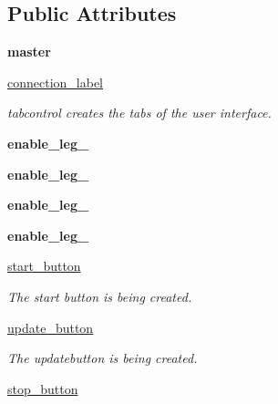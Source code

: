 \subsection*{Public Attributes}
\begin{DoxyCompactItemize}
\item 
\mbox{\label{classuser__interface_1_1GUI_ae7866f22227ae9688999aa757c0fea18}} 
{\bfseries master}
\item 
\hyperlink{classuser__interface_1_1GUI_a6f8c9e6abed97b6d338b8e4d9718dc7c}{connection\+\_\+label}
\begin{DoxyCompactList}\small\item\em tabcontrol creates the tabs of the user interface. \end{DoxyCompactList}\item 
\mbox{\label{classuser__interface_1_1GUI_aa4b397197906ad84e30580a810a655dd}} 
{\bfseries enable\+\_\+leg\+\_}
\item 
\mbox{\label{classuser__interface_1_1GUI_abbddb06508058d258c7d95441dece56d}} 
{\bfseries enable\+\_\+leg\+\_}
\item 
\mbox{\label{classuser__interface_1_1GUI_a4fd7bdcf24220df0222b5ec6d336c545}} 
{\bfseries enable\+\_\+leg\+\_}
\item 
\mbox{\label{classuser__interface_1_1GUI_afbc5abc61f35db93402945f6ed493da7}} 
{\bfseries enable\+\_\+leg\+\_}
\item 
\hyperlink{classuser__interface_1_1GUI_a961853020e92ea16f2e0c4720bebeda7}{start\+\_\+button}
\begin{DoxyCompactList}\small\item\em The start button is being created. \end{DoxyCompactList}\item 
\hyperlink{classuser__interface_1_1GUI_a960ed29e7286a5936b9ece35a2f230a5}{update\+\_\+button}
\begin{DoxyCompactList}\small\item\em The updatebutton is being created. \end{DoxyCompactList}\item 
\hyperlink{classuser__interface_1_1GUI_a44c35c7063800207f87f992b1b7d27e1}{stop\+\_\+button}

\end{DoxyCompactItemize}

